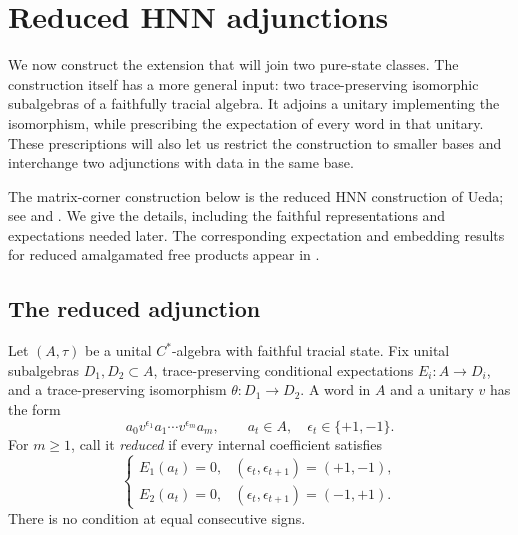 \section{Reduced HNN adjunctions}\label{sec:hnn}

We now construct the extension that will join two pure-state classes.
The construction itself has a more general input: two trace-preserving
isomorphic subalgebras of a faithfully tracial algebra.  It adjoins a
unitary implementing the isomorphism, while prescribing the expectation
of every word in that unitary.  These prescriptions will also let us
restrict the construction to smaller bases and interchange two
adjunctions with data in the same base.

The matrix-corner construction below is the reduced HNN construction of
Ueda; see \cite[Proposition~2.2 and Remark~2.3]{UedaPreprint2008} and
\cite{Ueda2008}.  We give the details, including the faithful
representations and expectations needed later.  The corresponding
expectation and embedding results for reduced amalgamated free products
appear in \cite[Lemma~1.1 and Theorem~1.3]{BlanchardDykema2001}.

\subsection{The reduced adjunction}

Let $(A,\tau)$ be a unital $C^*$-algebra with faithful tracial state.
Fix unital subalgebras $D_1,D_2\subset A$, trace-preserving conditional
expectations $E_i:A\to D_i$, and a trace-preserving isomorphism
$\theta:D_1\to D_2$.  A word in $A$ and a unitary $v$ has the form
\begin{equation}\label{na:hnn-word}
 a_0v^{\epsilon_1}a_1\cdots v^{\epsilon_m}a_m,
 \qquad a_t\in A,\quad\epsilon_t\in\{+1,-1\}.
\end{equation}
For $m\geq1$, call it \emph{reduced} if every internal coefficient
satisfies
\begin{equation}\label{na:hnn-turns}
 \begin{cases}
 E_1(a_t)=0,&(\epsilon_t,\epsilon_{t+1})=(+1,-1),\\
 E_2(a_t)=0,&(\epsilon_t,\epsilon_{t+1})=(-1,+1).
 \end{cases}
\end{equation}
There is no condition at equal consecutive signs.

